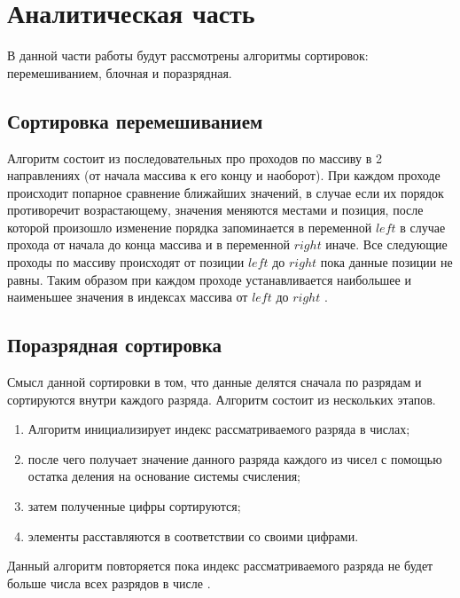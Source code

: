 \chapter{Аналитическая часть}
В данной части работы будут рассмотрены алгоритмы сортировок: перемешиванием, блочная и поразрядная.






\section{Сортировка перемешиванием}
Алгоритм состоит из последовательных про проходов по массиву в 2 направлениях (от начала массива к его концу и наоборот). При каждом проходе 
происходит попарное сравнение ближайших значений, в случае если их порядок противоречит возрастающему, значения меняются местами и позиция,
после которой произошло изменение порядка запоминается в переменной $left$ в случае прохода от начала до конца массива и в переменной $right$ иначе.
Все следующие проходы по массиву происходят от позиции $left$ до $right$ пока данные позиции не равны. Таким образом при каждом проходе устанавливается
наибольшее и наименьшее значения в индексах массива от $left$ до $right$ \cite{conctail_sort,article_sorts}.

\section{Поразрядная сортировка}
Смысл данной сортировки в том, что данные делятся сначала по разрядам и сортируются внутри каждого разряда.
Алгоритм состоит из нескольких этапов.
\begin{enumerate}
	\item Алгоритм инициализирует индекс рассматриваемого разряда в числах;
	\item после чего получает значение данного разряда каждого из чисел с помощью остатка деления на основание системы счисления;
	\item затем полученные цифры сортируются;
	\item элементы расставляются в соответствии со своими цифрами.
\end{enumerate}
Данный алгоритм повторяется пока индекс рассматриваемого разряда не будет больше числа всех разрядов в числе \cite{book_knut,article_sorts}.

